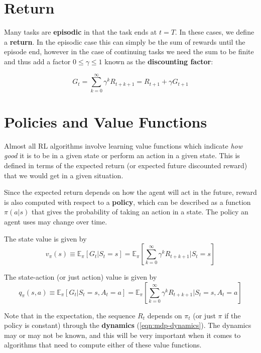 \documentclass[11pt]{report}
\begin{document}
\section{Return}
Many tasks are \textbf{episodic} in that the task ends at $t=T$. In these cases, we define a \textbf{return}. In the episodic case this can simply be the sum of rewards until the episode end, however in the case of continuing tasks we need the sum to be finite and thus add a factor $0 \le \gamma \le 1$ known as the \textbf{discounting factor}:

\begin{equation}
	G_t = \sum_{k=0}^{\infty} \gamma^kR_{t+k+1} = R_{t+1} + \gamma G_{t+1}
\end{equation}

\section{Policies and Value Functions}
Almost all RL algorithms involve learning value functions which indicate \textit{how good} it is to be in a given state or perform an action in a given state. This is defined in terms of the expected return (or expected future discounted reward) that we would get in a given situation.

Since the expected return depends on how the agent will act in the future, reward is also computed with respect to a \textbf{policy}, which can be described as a function $\pi(a|s)$ that gives the probability of taking an action in a state. The policy an agent uses may change over time.

The state value is given by
\begin{equation}
	\label{eqn:state-value}
	v_\pi(s) \equiv \mathbb{E}_\pi[G_t | S_t = s] = \mathbb{E}_\pi\left[\sum_{k=0}^{\infty} \gamma^k R_{t+k+1} | S_t = s \right]
\end{equation}

The state-action (or just action) value is given by
\begin{equation}
	\label{eqn:state-action-value}
	q_\pi(s,a) \equiv \mathbb{E}_\pi[G_t | S_t = s, A_t = a] = \mathbb{E}_\pi\left[\sum_{k=0}^{\infty} \gamma^k R_{t+k+1} | S_t = s, A_t = a \right]
\end{equation}

Note that in the expectation, the sequence $R_t$ depends on $\pi_t$ (or just $\pi$ if the policy is constant) through the \textbf{dynamics} (\autoref{eqn:mdp-dynamics}). The dynamics may or may not be known, and this will be very important when it comes to algorithms that need to compute either of these value functions.
\end{document}
